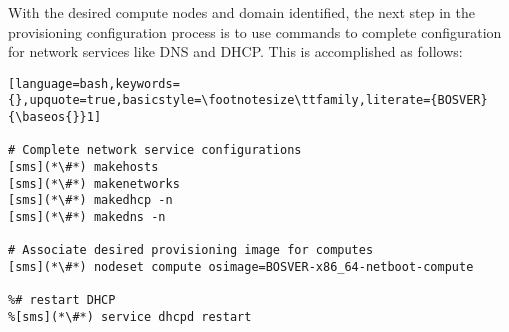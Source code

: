 With the desired compute nodes and domain identified, the next step in the
provisioning configuration process is to use \xCAT{} commands to complete
configuration for network services like DNS and DHCP. This is
accomplished as follows:

\begin{lstlisting}[language=bash,keywords={},upquote=true,basicstyle=\footnotesize\ttfamily,literate={BOSVER}{\baseos{}}1]

# Complete network service configurations
[sms](*\#*) makehosts
[sms](*\#*) makenetworks
[sms](*\#*) makedhcp -n
[sms](*\#*) makedns -n

# Associate desired provisioning image for computes
[sms](*\#*) nodeset compute osimage=BOSVER-x86_64-netboot-compute

%# restart DHCP
%[sms](*\#*) service dhcpd restart
\end{lstlisting}


